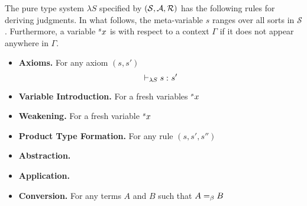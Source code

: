 \documentclass{article}
\begin{document}
\begin{definition}
The pure type system $\lambda S$ specified by $(\sorts, \axioms, \rules)$ has the following rules for deriving judgments.
In what follows, the meta-variable $s$ ranges over all sorts in $\mathcal S$.
Furthermore, a variable $\avar s x$ is  with respect to a context $\Gamma$ if it does not appear anywhere in $\Gamma$.

\begin{itemize}
\item
\textbf{Axioms.} For any axiom $(s, s')$
\[
    \judgment[\lS] {} {s} {s'}
\]

\item
\textbf{Variable Introduction.} For a fresh variables $\avar s x$
\begin{prooftree}

\end{prooftree}

\item
\textbf{Weakening.} For a fresh variable $\avar s x$
\begin{prooftree}
\end{prooftree}
	
\item
\textbf{Product Type Formation.} For any rule $(s, s', s'')$
\begin{prooftree}
\end{prooftree}

\item
\textbf{Abstraction.}
\begin{prooftree}
\end{prooftree}

\item
\textbf{Application.}
\begin{prooftree}
\end{prooftree}

\item
\textbf{Conversion.} For any terms $A$ and $B$ such that $A \eqbeta B$
\begin{prooftree}
\end{prooftree}
\end{itemize}
\end{definition}
\end{document}
